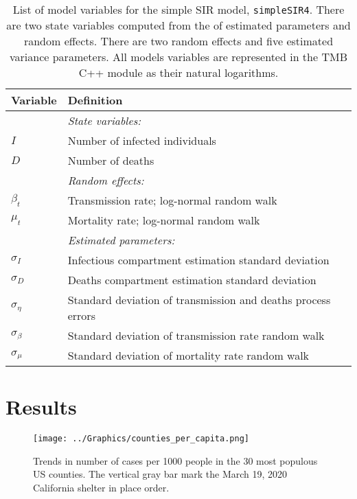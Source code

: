 \documentclass[12pt,letterpaper]{article}
\newcommand\SSm{{\tt simpleSIR4}}
\begin{document}
\begin{table}
\caption{List of model variables for the simple SIR model, \SSm.
There are two state variables computed from the of estimated
parameters and random effects.
There are two random effects and five estimated variance parameters.
All models variables are represented in the TMB C++ module as their
natural logarithms.
}
\label{tab:allvars1}
\begin{center}
\begin{tabular}{ll}
\hline
Variable & Definition\\
\hline
\hline
       & {\it State variables:}\\
$I$      & Number of infected individuals\\
$D$      & Number of deaths\\
       & {\it Random effects:}\\
$\beta_t$ & Transmission rate; log-normal random walk\\
$\mu_t$   & Mortality rate; log-normal random walk\\
       & {\it Estimated parameters:}\\
$\sigma_I$ & Infectious compartment estimation standard deviation\\
$\sigma_D$ & Deaths compartment estimation standard deviation\\
$\sigma_\eta$ & Standard deviation of transmission and deaths process errors\\
$\sigma_\beta$ & Standard deviation of transmission rate random walk\\
$\sigma_\mu$ & Standard deviation of mortality rate random walk\\
\hline
\end{tabular}
\end{center}
\end{table}

\section*{Results}

\begin{figure}
\begin{center}
\texttt{[image: ../Graphics/counties\_per\_capita.png]}
\end{center}
\caption{\label{fig:percap}
Trends in number of cases per 1000 people in the 30 most populous US
counties.
The vertical gray bar mark the March 19, 2020 California shelter in place order.
}
\end{figure}
\end{document}
